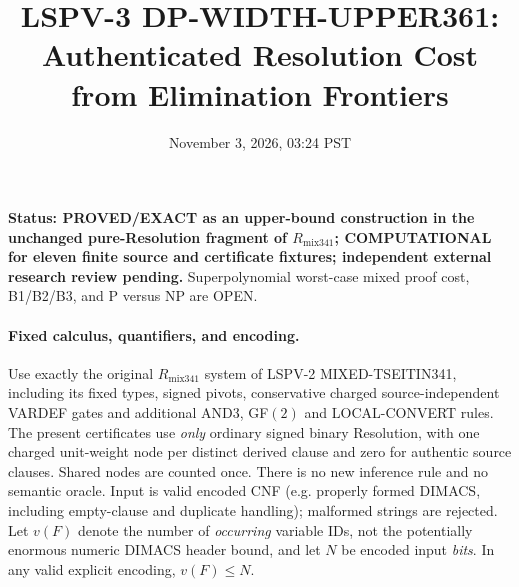 \documentclass[11pt]{article}
\title{LSPV-3 DP-WIDTH-UPPER361: Authenticated Resolution Cost from Elimination Frontiers}
\date{November 3, 2026, 03:24 PST}
\begin{document}
\maketitle
\noindent\textbf{Status: PROVED/EXACT as an upper-bound construction in the unchanged pure-Resolution fragment of $R_{\mathrm{mix341}}$; COMPUTATIONAL for eleven finite source and certificate fixtures; independent external research review pending.} Superpolynomial worst-case mixed proof cost, B1/B2/B3, and P versus NP are OPEN.

\paragraph{Fixed calculus, quantifiers, and encoding.}
Use exactly the original $R_{\mathrm{mix341}}$ system of LSPV-2 MIXED-TSEITIN341, including its fixed types, signed pivots, conservative charged source-independent VARDEF gates and additional AND3, GF$(2)$ and LOCAL-CONVERT rules. The present certificates use \emph{only} ordinary signed binary Resolution, with one charged unit-weight node per distinct derived clause and zero for authentic source clauses. Shared nodes are counted once. There is no new inference rule and no semantic oracle. Input is valid encoded CNF (e.g. properly formed DIMACS, including empty-clause and duplicate handling); malformed strings are rejected. Let $v(F)$ denote the number of \emph{occurring} variable IDs, not the potentially enormous numeric DIMACS header bound, and let $N$ be encoded input \emph{bits}. In any valid explicit encoding, $v(F)\le N$.
\end{document}
